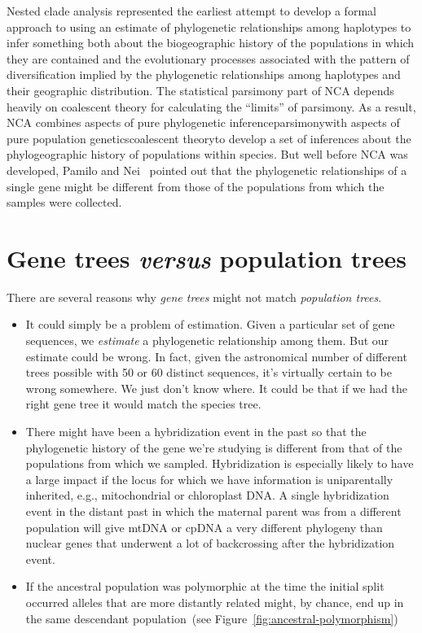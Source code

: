 \documentclass[12pt]{article}
\begin{document}
Nested clade analysis represented the earliest attempt to develop a
formal approach to using an estimate of phylogenetic relationships
among haplotypes to infer something both about the biogeographic
history of the populations in which they are contained and the
evolutionary processes associated with the pattern of diversification
implied by the phylogenetic relationships among haplotypes and their
geographic distribution. The statistical parsimony part of NCA depends
heavily on coalescent theory for calculating the ``limits'' of
parsimony. As a result, NCA combines aspects of pure phylogenetic
inference{\dash}parsimony{\dash}with aspects of pure population
genetics{\dash}coalescent theory{\dash}to develop a set of inferences
about the phylogeographic history of populations within species. But
well before NCA was developed, Pamilo and Nei~\cite{Pamilo-Nei-1988}
pointed out that the phylogenetic relationships of a single gene might
be different from those of the populations from which the samples were
collected.

\section*{Gene trees {\it versus\/} population trees}

There are several reasons why {\it gene trees\/} might not match {\it
  population trees}.

\begin{itemize}

\item It could simply be a problem of estimation. Given a particular
  set of gene sequences, we {\it estimate} a phylogenetic relationship
  among them. But our estimate could be wrong. In fact, given the
  astronomical number of different trees possible with 50 or 60
  distinct sequences, it's virtually certain to be wrong somewhere. We
  just don't know where. It could be that if we had the right gene
  tree it would match the species tree.

\item There might have been a hybridization event in the past so that
  the phylogenetic history of the gene we're studying is different
  from that of the populations from which we sampled. Hybridization is
  especially likely to have a large impact if the locus for which we
  have information is uniparentally inherited, e.g., mitochondrial or
  chloroplast DNA. A single hybridization event in the distant past in
  which the maternal parent was from a different population will give
  mtDNA or cpDNA a very different phylogeny than nuclear genes that
  underwent a lot of backcrossing after the hybridization event.

\item If the ancestral population was polymorphic at the time the
  initial split occurred alleles that are more distantly related
  might, by chance, end up in the same descendant population~(see
  Figure~\ref{fig:ancestral-polymorphism})

\end{itemize}
\end{document}
